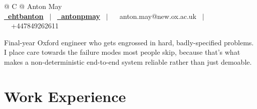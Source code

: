 \documentclass[a4paper,10pt]{article}
\begin{document}
\pagestyle{empty}
\raggedbottom



\begin{tabularx}{\linewidth}{@{} C @{}}
\Huge{Anton May} \\[8pt]
\href{https://github.com/ehtbanton}{\textbf{\raisebox{-0.05\height}\faGithub\ ehtbanton}} \ $|$ \
\href{https://www.linkedin.com/in/antonpmay}{\textbf{\raisebox{-0.05\height}\faLinkedin\ antonpmay}} \ $|$ \
\raisebox{-0.05\height}\faEnvelope \ anton.may@new.ox.ac.uk \ $|$ \
\raisebox{-0.05\height}\faMobile \ +447849262611 \\
\end{tabularx}

\vspace{6pt}

\begin{center}
\small{Final-year Oxford engineer who gets engrossed in hard, badly-specified problems. I place care towards the failure modes most people skip, because that's what makes a non-deterministic end-to-end system reliable rather than just demoable.}
\end{center}

\vspace{4pt}



\section{Work Experience}
\end{document}
